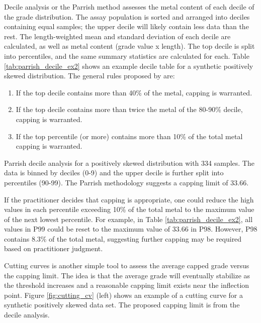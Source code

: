 Decile analysis or the Parrish method \citep{parrish1997geologist} assesses the metal content of each decile of the grade distribution. The assay population is sorted and arranged into deciles containing equal samples; the upper decile will likely contain less data than the rest. The length-weighted mean and standard deviation of each decile are calculated, as well as metal content (grade value x length). The top decile is split into percentiles, and the same summary statistics are calculated for each. Table \ref{tab:parrish_decile_ex2} shows an example decile table for a synthetic positively skewed distribution. The general rules proposed by \cite{parrish1997geologist} are:
\begin{enumerate}[noitemsep]
    \item If the top decile contains more than 40\% of the metal, capping is warranted.
    \item If the top decile contains more than twice the metal of the 80-90\% decile, capping is warranted.
    \item If the top percentile (or more) contains more than 10\% of the total metal capping is warranted.
\end{enumerate}

\begin{table}[!htb]
    \centering
    \caption{Parrish decile analysis for a positively skewed distribution with 334 samples. The data is binned by deciles (0-9) and the upper decile is further split into percentiles (90-99). The Parrish methodology suggests a capping limit of 33.66.}
    \resizebox{1\width}{!}{}
    \label{tab:parrish_decile_ex2}
\end{table}


If the practitioner decides that capping is appropriate, one could reduce the high values in each percentile exceeding 10\% of the total metal to the maximum value of the next lowest percentile. For example, in Table \ref{tab:parrish_decile_ex2}, all values in P99 could be reset to the maximum value of 33.66 in P98. However, P98 contains 8.3\% of the total metal, suggesting further capping may be required based on practitioner judgment.

Cutting curves \citep{roscoe1996cutting,leuangthong2015dealing} is another simple tool to assess the average capped grade versus the capping limit. The idea is that the average grade will eventually stabilize as the threshold increases and a reasonable capping limit exists near the inflection point. Figure \ref{fig:cutting_cv} (left) shows an example of a cutting curve for a synthetic positively skewed data set. The proposed capping limit is from the decile analysis.

